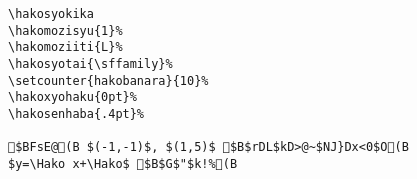 \begin{verbatim}
\hakosyokika
\hakomozisyu{1}%
\hakomoziiti{L}%
\hakosyotai{\sffamily}%
\setcounter{hakobanara}{10}%
\hakoxyohaku{0pt}%
\hakosenhaba{.4pt}%

$BFsE@(B $(-1,-1)$, $(1,5)$ $B$rDL$kD>@~$NJ}Dx<0$O(B
$y=\Hako x+\Hako$ $B$G$"$k!%(B
\end{verbatim}
